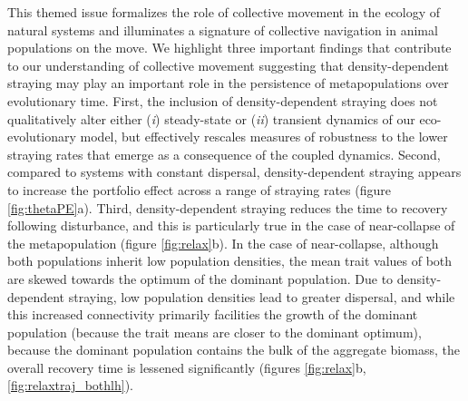 \documentclass{revtex4}
\begin{document}
This themed issue formalizes the role of collective movement in the ecology of natural systems and illuminates a signature of collective navigation in animal populations on the move.
We highlight three important findings that contribute to our understanding of collective movement suggesting that density-dependent straying may play an important role in the persistence of metapopulations over evolutionary time.
First, the inclusion of density-dependent straying does not qualitatively alter either (\emph{i}) steady-state or (\emph{ii}) transient dynamics of our eco-evolutionary model, but effectively rescales measures of robustness to the lower straying rates that emerge as a consequence of the coupled dynamics.
Second, compared to systems with constant dispersal, density-dependent straying appears to increase the portfolio effect across a range of straying rates (figure \ref{fig:thetaPE}a). 
Third, density-dependent straying reduces the time to recovery following disturbance, and this is particularly true in the case of near-collapse of the metapopulation (figure \ref{fig:relax}b).
In the case of near-collapse, although both populations inherit low population densities, the mean trait values of both are skewed towards the optimum of the dominant population.
Due to density-dependent straying, low population densities lead to greater dispersal, and while this increased connectivity primarily facilities the growth of the dominant population (because the trait means are closer to the dominant optimum), because the dominant population contains the bulk of the aggregate biomass, the overall recovery time is lessened significantly (figures \ref{fig:relax}b, \ref{fig:relaxtraj_bothlh}).



\end{document}
